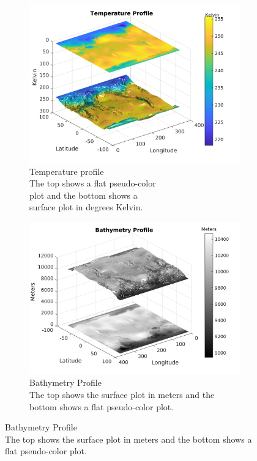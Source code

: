 \documentclass[twoside]{bsu-ms}
\begin{document}
 \begin{figure}[!htbp]
\centering
\begin{subfigure}{0.5\textwidth}
  \centering
  \includegraphics[width=\textwidth,clip=True,trim=0cm 0cm 1cm 0cm]{images/tempprof.png}
  \caption{Temperature profile\\ The top shows a flat pseudo-color\\ plot and the bottom shows a \\surface plot in degrees Kelvin. }
  \label{fig:subfig1}
\end{subfigure}%
\begin{subfigure}{0.5\textwidth}
  \centering
  \includegraphics[width=\textwidth,clip=True,trim=0cm 0cm 1cm 0cm]{images/bathprof.png}
  \caption{Bathymetry Profile\\ The top shows the surface plot in meters and the bottom shows a flat pseudo-color plot.}
\end{subfigure}


\end{figure}
\end{document}
